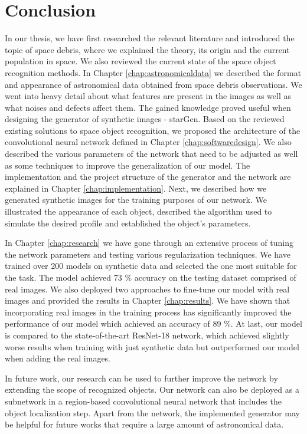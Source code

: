 \chapter*{Conclusion}

In our thesis, we have first researched the relevant literature and introduced the topic of space debris, where we explained the theory, its origin and the current population in space. We also reviewed the current state of the space object recognition methods. 
In Chapter \ref{chap:astronomicaldata} we described the format and appearance of astronomical data obtained from space debris observations. We went into heavy detail about what features are present in the images as well as what noises and defects affect them. 
The gained knowledge proved useful when designing the generator of synthetic images - starGen.
Based on the reviewed existing solutions to space object recognition, we proposed the architecture of the convolutional neural network defined in Chapter \ref{chap:softwaredesign}. We also described the various parameters of the network that need to be adjusted as well as some techniques to improve the generalization of our model. 
The implementation and the project structure of the generator and the network are explained in Chapter \ref{chap:implementation}. Next, we described how we generated synthetic images for the training purposes of our network. We illustrated the appearance of each object, described the algorithm used to simulate the desired profile and established the object's parameters. 

In Chapter \ref{chap:research} we have gone through an extensive process of tuning the network parameters and testing various regularization techniques. We have trained over 200 models on synthetic data and selected the one most suitable for the task. The model achieved 73 \% accuracy on the testing dataset comprised of real images. 
We also deployed two approaches to fine-tune our model with real images and provided the results in Chapter \ref{chap:results}. We have shown that incorporating real images in the training process has significantly improved the performance of our model which achieved an accuracy of 89 \%. At last, our model is compared to the state-of-the-art ResNet-18 network, which achieved slightly worse results when training with just synthetic data but outperformed our model when adding the real images. 

In future work, our research can be used to further improve the network by extending the scope of recognized objects. Our network can also be deployed as a subnetwork in a region-based convolutional neural network that includes the object localization step. Apart from the network, the implemented generator may be helpful for future works that require a large amount of astronomical data. 




